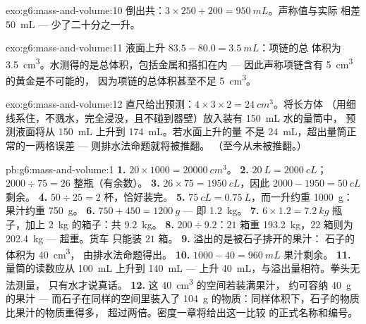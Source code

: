 \begin{solution}{exo:g6:mass-and-volume:10}
倒出共：$3 \times 250 + 200 = \qty{950}{mL}$。声称值与实际
相差 \qty{50}{mL} --- 少了二十分之一升。
\end{solution}

\begin{solution}{exo:g6:mass-and-volume:11}
液面上升 $83.5 - 80.0 = \qty{3.5}{mL}$：项链的总
体积为 \qty{3.5}{cm^3}。水测得的是总体积，包括金属和搭扣在内 ---
因此声称项链含有 \qty{5}{cm^3} 的黄金是不可能的，
因为项链的总体积甚至不足 \qty{5}{cm^3}。
\end{solution}

\begin{solution}{exo:g6:mass-and-volume:12}
直尺给出预测：$4 \times 3 \times 2 = \qty{24}{cm^3}$。将长方体
（用细线系住，不溅水，完全浸没，且不碰到器壁）放入装有 \qty{150}{mL} 水的量筒中，
预测液面将从 \qty{150}{mL} 上升到 \qty{174}{mL}。若水面上升的量
不是 \qty{24}{mL}，超出量筒正常的一两格误差 ---
则排水法命题就将被推翻。
（至今从未被推翻。）
\end{solution}

\begin{solution}{pb:g6:mass-and-volume:1}
\textbf{1.} $20 \times 1000 = \qty{20000}{cm^3}$。
\textbf{2.} $\qty{20}{L} = \qty{2000}{cL}$；$2000 \div 75 = 26$
整瓶（有余数）。
\textbf{3.} $26 \times 75 = \qty{1950}{cL}$，因此 $2000 - 1950 =
\qty{50}{cL}$ 剩余。
\textbf{4.} $50 \div 25 = 2$ 杯，恰好装完。
\textbf{5.} $\qty{75}{cL} = \qty{0.75}{L}$，而一升约重
\qty{1000}{g}：果汁约重 \qty{750}{g}。
\textbf{6.} $750 + 450 = \qty{1200}{g}$ --- 即 \qty{1.2}{kg}。
\textbf{7.} $6 \times 1.2 = \qty{7.2}{kg}$ 瓶子，加上
\qty{2}{kg} 的箱子：共 \qty{9.2}{kg}。
\textbf{8.} $200 \div 9.2$：$21$ 箱重
\qty{193.2}{kg}，$22$ 箱则为 \qty{202.4}{kg} --- 超重。货车
只能装 $21$ 箱。
\textbf{9.} 溢出的是被石子排开的果汁：
石子的体积为 \qty{40}{cm^3}，
由排水法命题得出。
\textbf{10.} $1000 - 40 = \qty{960}{mL}$ 果汁剩余。
\textbf{11.} 量筒的读数应从 \qty{100}{mL} 上升到
\qty{140}{mL} --- 上升 \qty{40}{mL}，与溢出量相符。拳头无法测量，
只有水才说真话。
\textbf{12.} 这 \qty{40}{cm^3} 的空间若装满果汁，
约可容纳 \qty{40}{g} 的果汁 --- 而石子在同样的空间里装入了 \qty{104}{g}
的物质：同样体积下，石子的物质比果汁的物质重得多，
超过两倍。密度一章将给出这一比较
的正式名称和编号。
\end{solution}
